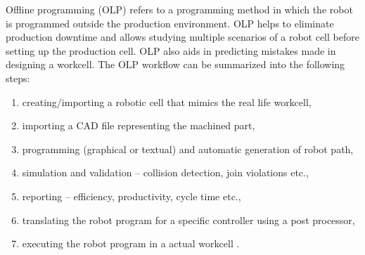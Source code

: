 Offline programming  (OLP) refers to a programming method in which the robot is programmed outside the production environment. OLP helps to eliminate production downtime and allows studying multiple scenarios of a robot cell before setting up the production cell. OLP also aids in predicting mistakes made in designing a workcell. The OLP workflow can be summarized into the following steps:

\begin{enumerate}
  \item creating/importing a robotic cell that mimics the real life workcell,
  \item importing a CAD file representing the machined part,
  \item programming (graphical or textual) and automatic generation of robot path,
  \item simulation and validation -- collision detection, join violations etc.,
  \item reporting -- efficiency, productivity, cycle time etc.,
  \item translating the robot program for a specific controller using a post processor,
  \item executing the robot program in a actual workcell \cite{offlinesteps}.
\end{enumerate}
